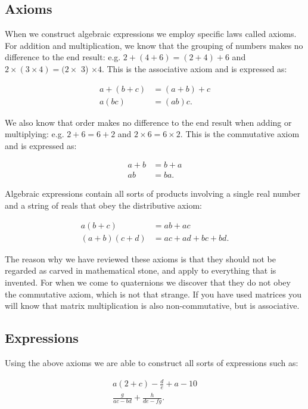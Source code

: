 \documentclass[10pt]{article}
\begin{document}
\subsection{Axioms}
When we construct algebraic expressions we employ specific laws called axioms. For addition and multiplication, we know that the grouping of numbers makes no difference to the end result: e.g. $2+(4+6)=(2+4)+6$ and $2 \times(3 \times 4)=(2 \times$ 3) $\times 4$. This is the associative axiom and is expressed as:

$$
\begin{aligned}
a+(b+c) & =(a+b)+c \\
a(b c) & =(a b) c .
\end{aligned}
$$

We also know that order makes no difference to the end result when adding or multiplying: e.g. $2+6=6+2$ and $2 \times 6=6 \times 2$. This is the commutative axiom and is expressed as:

$$
\begin{aligned}
a+b & =b+a \\
a b & =b a .
\end{aligned}
$$

Algebraic expressions contain all sorts of products involving a single real number and a string of reals that obey the distributive axiom:

$$
\begin{aligned}
a(b+c) & =a b+a c \\
(a+b)(c+d) & =a c+a d+b c+b d .
\end{aligned}
$$

The reason why we have reviewed these axioms is that they should not be regarded as carved in mathematical stone, and apply to everything that is invented. For when we come to quaternions we discover that they do not obey the commutative axiom, which is not that strange. If you have used matrices you will know that matrix multiplication is also non-commutative, but is associative.

\subsection{Expressions}
Using the above axioms we are able to construct all sorts of expressions such as:

$$
\begin{gathered}
a(2+c)-\frac{d}{e}+a-10 \\
\frac{g}{a c-b d}+\frac{h}{d e-f g} .
\end{gathered}
$$
\end{document}
